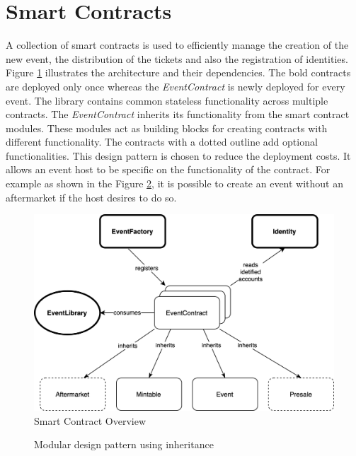 \section{Smart Contracts}

A collection of smart contracts is used to efficiently manage the creation of the new event, the distribution of the tickets and also the registration of identities. Figure \ref{fig:smart-contract-overview} illustrates the architecture and their dependencies. The bold contracts are deployed only once whereas the \textit{EventContract} is newly deployed for every event. The library contains common stateless functionality across multiple contracts. The \textit{EventContract} inherits its functionality from the smart contract modules. These modules act as building blocks for creating contracts with different functionality. The contracts with a dotted outline add optional functionalities. This design pattern is chosen to reduce the deployment costs. It allows an event host to be specific on the functionality of the contract. For example as shown in the Figure \ref{code:smart-contract-inheritance}, it is possible to create an event without an aftermarket if the host desires to do so. 

\begin{figure}[H]
    \centering
    \includegraphics[width=14cm]{figures/smart-contract-overview-4.png}
    \caption{Smart Contract Overview}
    \label{fig:smart-contract-overview}
\end{figure}

\begin{figure}[H]
    
    \caption{Modular design pattern using inheritance}
    \label{code:smart-contract-inheritance}
\end{figure}

